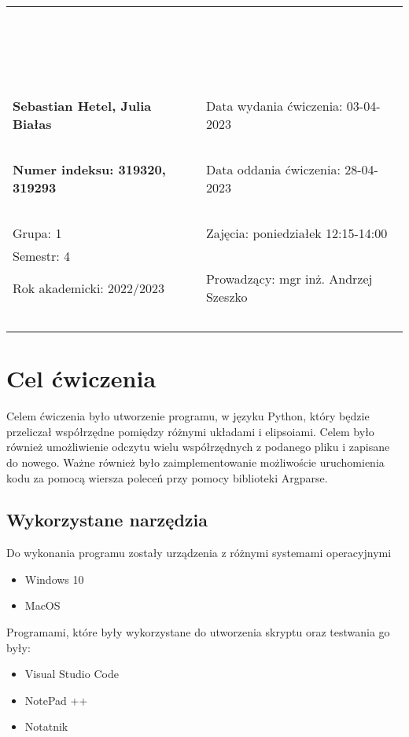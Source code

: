\documentclass[12pt, a4paper]{article}
\begin{document}
\begin{table}[!htb]
\begin{tabular}{|p{8cm}|p{7cm}|}
			\multicolumn{2}{|l|}{ } \\
			\multicolumn{2}{|l|}{ } \\
			\multicolumn{2}{|l|}{ } \\
			\multicolumn{2}{|l|}{ } \\
			\multicolumn{2}{|l|}{ } \\
			\multicolumn{2}{|l|}{ } \\
			\multicolumn{2}{|l|}{ } \\
			\multicolumn{2}{|l|}{ } \\
			\multicolumn{2}{|l|}{ } \\ \hline
			\ & \ \\
			\ & \ \\
			\textbf{Sebastian Hetel, Julia Białas} & Data wydania ćwiczenia: 03-04-2023 \\
			\ & \ \\
			\textbf{Numer indeksu: 319320, 319293}& Data oddania ćwiczenia: 28-04-2023 \\
			\ & \ \\
			Grupa: 1 & Zajęcia: poniedziałek 12:15-14:00 \\
			Semestr: 4 & \\
			Rok akademicki: 2022/2023 &  Prowadzący: mgr inż. Andrzej Szeszko \\
			\ & \ \\ \hline
			
			
\end{tabular}
		
\end{table}
	
\newpage
\section{Cel ćwiczenia}
Celem ćwiczenia było utworzenie programu, w języku Python, który będzie przeliczał współrzędne pomiędzy różnymi układami i elipsoiami. Celem było również umożliwienie odczytu wielu współrzędnych z podanego pliku i zapisane do nowego. Ważne również było zaimplementowanie możliwoście uruchomienia kodu za pomocą wiersza poleceń przy pomocy biblioteki Argparse.  
\subsection{Wykorzystane narzędzia}
Do wykonania programu zostały urządzenia z różnymi systemami operacyjnymi
\begin{itemize}
\item Windows 10
\item MacOS
\end{itemize} 
Programami, które były wykorzystane do utworzenia skryptu oraz testwania go były:
\begin{itemize}
\item Visual Studio Code
\item NotePad ++
\item Notatnik
\end{itemize} 
\end{document}
